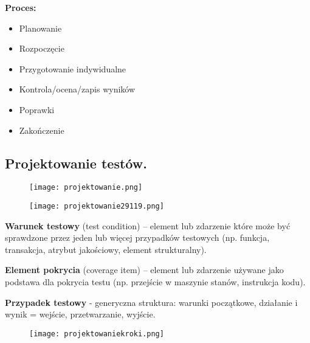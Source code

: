 \documentclass[../main.tex]{subfiles}
\begin{document}
    \textbf{Proces:}
    \begin{itemize}
        \item Planowanie
        \item Rozpoczęcie
        \item Przygotowanie indywidualne
        \item Kontrola/ocena/zapis wyników
        \item Poprawki
        \item Zakończenie
    \end{itemize}

    \subsection{Projektowanie testów.}
    \begin{figure}[H]
        \texttt{[image: projektowanie.png]}
    \end{figure}
    \begin{figure}[H]
        \texttt{[image: projektowanie29119.png]}
    \end{figure}


    \textbf{Warunek testowy} (test condition) – element lub zdarzenie które może być
    sprawdzone przez jeden lub więcej przypadków testowych (np. funkcja,
    transakcja, atrybut jakościowy, element strukturalny).

    \textbf{Element pokrycia} (coverage item) – element lub zdarzenie używane jako
    podstawa dla pokrycia testu (np. przejście w maszynie stanów, instrukcja
    kodu).

    \textbf{Przypadek testowy} - generyczna struktura: warunki początkowe, działanie i wynik = wejście, przetwarzanie, wyjście.

    \begin{figure}[H]
        \texttt{[image: projektowaniekroki.png]}
    \end{figure}
\end{document}
